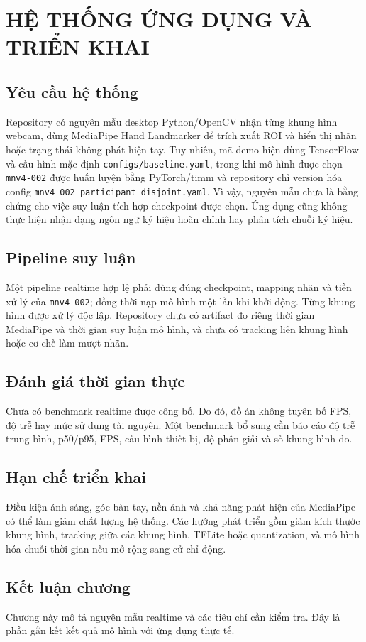 \chapter{HỆ THỐNG ỨNG DỤNG VÀ TRIỂN KHAI}

\section{Yêu cầu hệ thống}
Repository có nguyên mẫu desktop Python/OpenCV nhận từng khung hình webcam, dùng MediaPipe Hand Landmarker để trích xuất ROI và hiển thị nhãn hoặc trạng thái không phát hiện tay. Tuy nhiên, mã demo hiện dùng TensorFlow và cấu hình mặc định \texttt{configs/baseline.yaml}, trong khi mô hình được chọn \texttt{mnv4-002} được huấn luyện bằng PyTorch/timm và repository chỉ version hóa config \texttt{mnv4\_002\_participant\_disjoint.yaml}. Vì vậy, nguyên mẫu chưa là bằng chứng cho việc suy luận tích hợp checkpoint được chọn. Ứng dụng cũng không thực hiện nhận dạng ngôn ngữ ký hiệu hoàn chỉnh hay phân tích chuỗi ký hiệu.

\section{Pipeline suy luận}
Một pipeline realtime hợp lệ phải dùng đúng checkpoint, mapping nhãn và tiền xử lý của \texttt{mnv4-002}; đồng thời nạp mô hình một lần khi khởi động. Từng khung hình được xử lý độc lập. Repository chưa có artifact đo riêng thời gian MediaPipe và thời gian suy luận mô hình, và chưa có tracking liên khung hình hoặc cơ chế làm mượt nhãn.

\section{Đánh giá thời gian thực}
Chưa có benchmark realtime được công bố. Do đó, đồ án không tuyên bố FPS, độ trễ hay mức sử dụng tài nguyên. Một benchmark bổ sung cần báo cáo độ trễ trung bình, p50/p95, FPS, cấu hình thiết bị, độ phân giải và số khung hình đo.

\section{Hạn chế triển khai}
Điều kiện ánh sáng, góc bàn tay, nền ảnh và khả năng phát hiện của MediaPipe có thể làm giảm chất lượng hệ thống. Các hướng phát triển gồm giảm kích thước khung hình, tracking giữa các khung hình, TFLite hoặc quantization, và mô hình hóa chuỗi thời gian nếu mở rộng sang cử chỉ động.

\section{Kết luận chương}
Chương này mô tả nguyên mẫu realtime và các tiêu chí cần kiểm tra. Đây là phần gắn kết kết quả mô hình với ứng dụng thực tế.
